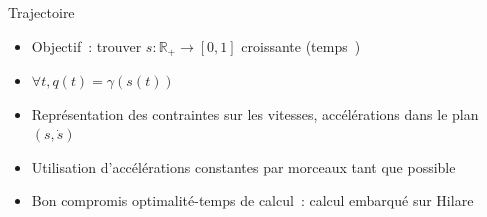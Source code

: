 \documentclass[11pt]{beamer}
\begin{document}
\begin{frame}{Trajectoire}
	\begin{itemize}
		\item Objectif~: trouver $s : \mathbb{R}_+ \to [0, 1]$ croissante
			(\og{}temps~\fg)
		\item $\forall t, q(t) = \gamma(s(t))$
		\item Représentation des contraintes sur les vitesses, accélérations
			dans le plan $(s, \dot{s})$
		\item Utilisation d'accélérations constantes par morceaux \og{}tant que
			possible~\fg{}
		\item Bon compromis optimalité-temps de calcul~: calcul embarqué sur
			Hilare
	\end{itemize}
\end{frame}
\end{document}
